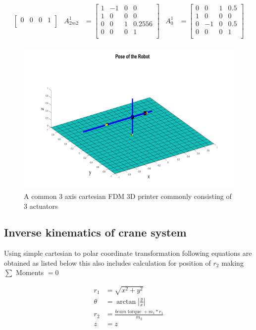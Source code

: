 \documentclass{UoNMCHA}
\numberwithin{equation}{section}
\begin{document}
\begin{align*}
\begin{bmatrix}
	0 & 0 & 0 & 1\\
	\end{bmatrix} & 		
	A_{2m2}^1 &= 
	\begin{bmatrix}
	1 & -1 & 0 & 0 \\
	1 & 0 & 0 & 0\\
	0 & 0 & 1 & 0.2556\\
	0 & 0 & 0 & 1\\
	\end{bmatrix} &	
	A_0^1 &= 
	\begin{bmatrix}
	0 & 0 & 1 & 0.5 \\
	1 & 0 & 0 & 0\\
	0 & -1 & 0 & 0.5\\
	0 & 0 & 0 & 1\\
	\end{bmatrix} \\
	\end{align*}
	
	\begin{figure}[H]
		\begin{center}
			\includegraphics[width=.8\linewidth]{figs/Picture8}
			\caption{A  common 3 axis cartesian FDM 3D printer commonly consisting of 3 actuators}
			\label{figs/Picture8}
		\end{center}
	\end{figure}
	
	\subsection{Inverse kinematics of crane system}
	
	Using simple cartesian to polar coordinate transformation following equations are obtained as listed
	below this also includes calculation for position of $r_{2}$ making $\sum$ Moments $=0$
	
	\begin{align}
	r_{1} & =\sqrt{x^{2}+y^{2}} \\ 
	\theta & =\arctan \left|\frac{y}{x}\right| \\
	r_{2} &=\frac{b e a m \operatorname{torque}+m_{1} * r_{1}}{m_{2}} \\ 
	z & =z 
	\end{align}
	
\end{document}
